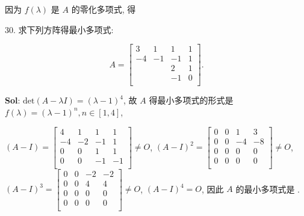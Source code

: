因为 $f(\lambda)$ 是 $A$ 的零化多项式, 得


\vspace{12pt}

30. 求下列方阵得最小多项式:

$$
A=
\begin{bmatrix}
    3&1&1&1\\
    -4&-1&-1&1\\
    &&2&1\\
    &&-1&0\\
\end{bmatrix}.
$$

\textbf{Sol}: $\text{det}(A-\lambda I)=(\lambda-1)^4$, 故 $A$ 得最小多项式的形式是 $f(\lambda)=(\lambda-1)^n,n\in[1,4]$,

$(A-I)=\begin{bmatrix}
    4&1&1&1\\
    -4&-2&-1&1\\
    0&0&1&1\\
    0&0&-1&-1\\
\end{bmatrix}\not=O$, $(A-I)^2=\begin{bmatrix}
    0&0&1&3\\
    0&0&-4&-8\\
    0&0&0&0\\
    0&0&0&0\\
\end{bmatrix}\not=O$, $(A-I)^3=\begin{bmatrix}
    0&0&-2&-2\\
    0&0&4&4\\
    0&0&0&0\\
    0&0&0&0\\
\end{bmatrix}\not=O$, $(A-I)^4=O$, 因此 $A$ 的最小多项式是 .


\vspace{12pt}


